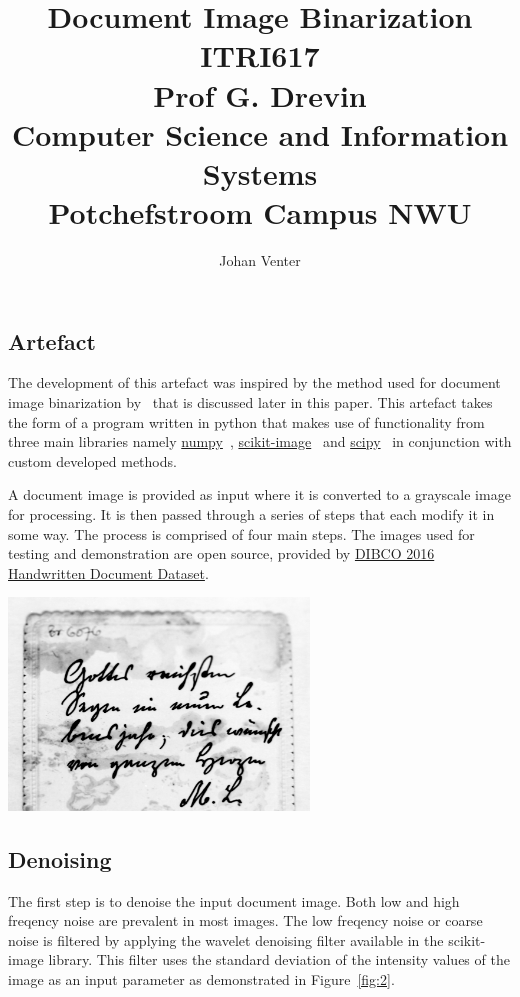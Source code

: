 \documentclass[a4paper]{article}
\title{
    Document Image Binarization \\[12pt]
    \large
    ITRI617 \\[10pt]
    Prof G. Drevin \\[10pt]
    Computer Science and Information Systems \\[10pt]
    Potchefstroom Campus NWU
}
\author{Johan Venter}
\begin{document}
\maketitle
\newpage

\tableofcontents
\newpage
\begin{multicols}{2}
    \section{Artefact}
    The development of this artefact was inspired by the method used for document
    image binarization by~\cite{su2012robust} that is discussed later in this
    paper. This artefact takes the form of a program written in python that makes
    use of functionality from three main libraries namely
    \href{https://numpy.org/}{numpy}~\cite{numpy},
    \href{https://scikit-image.org/}{scikit-image}~\cite{scikit-image} and
    \href{https://scikit-image.org/}{scipy}~\cite{2020SciPy-NMeth} in conjunction
    with custom developed methods. \par
    A document image is provided as input where it is converted to a grayscale image for processing. It is then passed through a series of steps that each modify it in some way. The process is comprised of four main steps. The images used for testing and
    demonstration are open source, provided by
    \href{https://vc.ee.duth.gr/h-dibco2016/}{DIBCO 2016 Handwritten Document
        Dataset}.

    \noindent
    \begin{minipage}{\linewidth}
        \centering
        \includegraphics[width=8cm]{original.png}
        \label{fig:1}
    \end{minipage}

    \subsection{Denoising}
    The first step is to denoise the input document image. Both low and high freqency noise are prevalent in most images. The low freqency noise or coarse noise is filtered by  applying the wavelet denoising filter available in the scikit-image library. This filter uses the standard deviation of the intensity values of the image as an input parameter as demonstrated in Figure~\ref{fig:2}.


\end{multicols}
\end{document}

